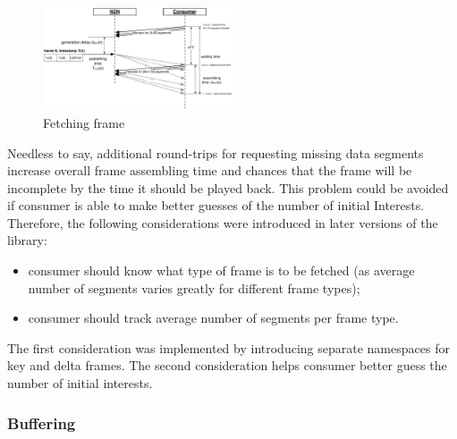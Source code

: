 \documentclass{icn/sig-alternate-2012} %
\begin{document}
\begin{figure}[t!]
\centering
\includegraphics[width=0.5\textwidth]{frame-fetch}
\vspace{-18pt}
\caption{Fetching frame}
\label{fig:pull}
\end{figure}

Needless to say, additional round-trips for requesting missing data segments increase overall frame assembling time and chances that the frame will be incomplete by the time it should be played back. This problem could be avoided if consumer is able to make better guesses of the number of initial Interests. Therefore, the following considerations were introduced in later versions of the library:
\begin{itemize}
\item consumer should know what type of frame is to be fetched (as average number of segments varies greatly for different frame types);
\item consumer should track average number of segments per frame type.
\end{itemize}

The first consideration was implemented by introducing separate namespaces for key and delta frames. The second consideration helps consumer better guess the number of initial interests.

\subsubsection{Buffering}

\end{document}
